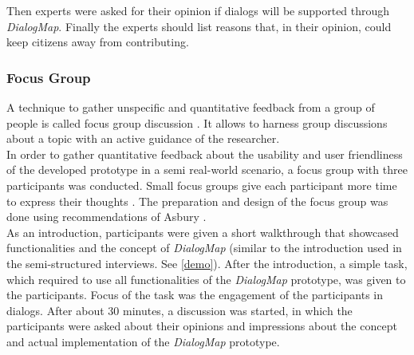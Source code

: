 Then experts were asked for their opinion if dialogs will be supported through \textit{DialogMap}. Finally the experts should list reasons that, in their opinion, could keep citizens away from contributing.

\subsubsection{Focus Group}
A technique to gather unspecific and quantitative feedback from a group of people is called focus group discussion \cite{morgan1996_focus_groups}. It allows to harness group discussions about a topic with an active guidance of the researcher.\\
In order to gather quantitative feedback about the usability and user friendliness of the developed prototype in a semi real-world scenario, a focus group with three participants was conducted. Small focus groups give each participant more time to express their thoughts \cite{morgan1996_focus_groups}. The preparation and design of the focus group was done using recommendations of Asbury \cite{asbury1995overview}.\\
As an introduction, participants were given a short walkthrough that showcased functionalities and the concept of \textit{DialogMap} (similar to the introduction used in the semi-structured interviews. See \ref{demo}). After the introduction, a simple task, which required to use all functionalities of the \textit{DialogMap} prototype, was given to the participants. Focus of the task was the engagement of the participants in dialogs. After about 30 minutes, a discussion was started, in which the participants were asked about their opinions and impressions about the concept and actual implementation of the \textit{DialogMap} prototype.
